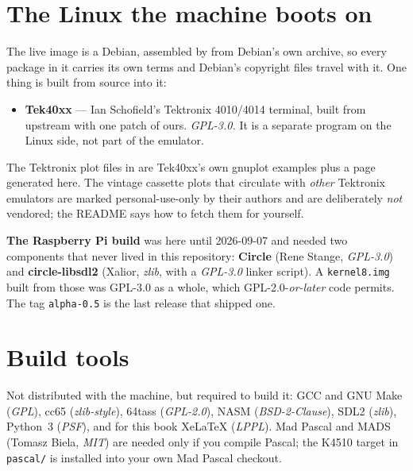 \section{The Linux the machine boots on}
The live image is a Debian, assembled by  from
Debian's own archive, so every package in it carries its own terms and
Debian's copyright files travel with it. One
thing is built from source into it:
\begin{itemize}[leftmargin=1.4em]
\item \textbf{Tek40xx} --- Ian Schofield's Tektronix 4010/4014
  terminal, built from upstream with one patch of ours.
  \emph{GPL-3.0.} It is a separate program on the Linux side, not part
  of the emulator.
\end{itemize}
\noindent The Tektronix plot files in  are
Tek40xx's own gnuplot examples plus a page generated here. The vintage
cassette plots that circulate with \emph{other} Tektronix emulators are
marked personal-use-only by their authors and are deliberately \emph{not}
vendored; the README says how to fetch them for yourself.

\begin{aside}
\textbf{The Raspberry Pi build} was here until 2026-09-07 and needed two
components that never lived in this repository: \textbf{Circle} (Rene
Stange, \emph{GPL-3.0}) and \textbf{circle-libsdl2} (Xalior,
\emph{zlib}, with a \emph{GPL-3.0} linker script). A \verb|kernel8.img|
built from those was GPL-3.0 as a whole, which GPL-2.0-\emph{or-later}
code permits. The tag \texttt{alpha-0.5} is the last release that
shipped one.
\end{aside}

\section{Build tools}
Not distributed with the machine, but required to build it: GCC and
GNU Make (\emph{GPL}), cc65 (\emph{zlib-style}), 64tass
(\emph{GPL-2.0}), NASM (\emph{BSD-2-Clause}), SDL2 (\emph{zlib}),
Python~3 (\emph{PSF}), and for this book XeLaTeX (\emph{LPPL}). Mad
Pascal and MADS (Tomasz Biela, \emph{MIT}) are needed only if you
compile Pascal; the K4510 target in \verb|pascal/| is installed into
your own Mad Pascal checkout.

